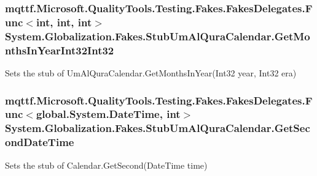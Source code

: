 \hypertarget{class_system_1_1_globalization_1_1_fakes_1_1_stub_um_al_qura_calendar_acc04dfe55a6ddad61ef44bb57a27c466}{
\subsubsection[{Get\-Months\-In\-Year\-Int32\-Int32}]{\setlength{\rightskip}{0pt plus 5cm}mqttf.\-Microsoft.\-Quality\-Tools.\-Testing.\-Fakes.\-Fakes\-Delegates.\-Func$<$int, int, int$>$ System.\-Globalization.\-Fakes.\-Stub\-Um\-Al\-Qura\-Calendar.\-Get\-Months\-In\-Year\-Int32\-Int32}}\label{class_system_1_1_globalization_1_1_fakes_1_1_stub_um_al_qura_calendar_acc04dfe55a6ddad61ef44bb57a27c466}


Sets the stub of Um\-Al\-Qura\-Calendar.\-Get\-Months\-In\-Year(\-Int32 year, Int32 era)

\hypertarget{class_system_1_1_globalization_1_1_fakes_1_1_stub_um_al_qura_calendar_ad80b25a74b06eb288c5d1a305c26cb68}{
\subsubsection[{Get\-Second\-Date\-Time}]{\setlength{\rightskip}{0pt plus 5cm}mqttf.\-Microsoft.\-Quality\-Tools.\-Testing.\-Fakes.\-Fakes\-Delegates.\-Func$<$global.\-System.\-Date\-Time, int$>$ System.\-Globalization.\-Fakes.\-Stub\-Um\-Al\-Qura\-Calendar.\-Get\-Second\-Date\-Time}}\label{class_system_1_1_globalization_1_1_fakes_1_1_stub_um_al_qura_calendar_ad80b25a74b06eb288c5d1a305c26cb68}


Sets the stub of Calendar.\-Get\-Second(\-Date\-Time time)

